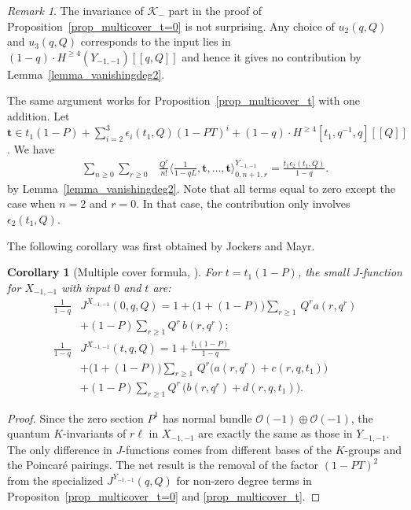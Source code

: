 \documentclass[11pt]{amsart}
\newtheorem{corollary}[theorem]{Corollary}
\newtheorem*{main theorem*}{Main Theorem}
\theoremstyle{remark}
\newtheorem{remark}[theorem]{Remark}
\numberwithin{equation}{section}
\def\O{\mathcal{O}}
\begin{document}
\begin{remark}
The invariance of $\mathcal{K}_-$ part in the proof of Proposition~\ref{prop_multicover_t=0} is not surprising. Any choice of $u_2(q,Q)$ and $u_3(q,Q)$ corresponds to the input lies in $(1-q)\cdot H^{\geq 4}(Y_{-1,-1})[\![q, Q]\!]$ and hence it gives no contribution by Lemma~\ref{lemma_vanishingdeg2}.

The same argument works for Proposition~\ref{prop_multicover_t} with one addition. Let $\mathbf{t} \in  t_1(1-P) + \sum_{i=2}^3\epsilon_i(t_1,Q)(1-PT)^i + (1-q) \cdot H^{\geq 4}[t_1,q^{-1},q][\![Q]\!] $. We have
\[
\begin{split}
\sum_{n\geq 0}\sum_{r\geq 0} & \frac{Q^r}{n!}\langle \frac{1}{1-qL}, \mathbf{t},\dots, \mathbf{t}\rangle_{0,n+1,r}^{Y_{-1,-1}}
 =\frac{ t_1 \epsilon_2(t_1,Q)}{1-q}.
\end{split}
\]
by Lemma~\ref{lemma_vanishingdeg2}. Note that all terms equal to zero except the case when $n=2$ and $r=0$. In that case, the contribution only involves $\epsilon_2(t_1,Q)$.
\end{remark}

The following corollary was first obtained by Jockers and Mayr.

\begin{corollary}[Multiple cover formula, {\cite[\S~2.3]{Jockers_Mayr_2019} } ] \label{c:4.8}
For $t = t_1(1-P)$, the small $J$-function for $X_{-1,-1}$ with input $0$ and $t$ are:
\[
\begin{split}
\frac{1}{1-q} & J^{X_{-1,-1}}(0,q,Q) = 1 + \Big(1 +(1-P)\Big)\sum_{r \geq 1} \, Q^r a(r, q^r) 
\\
& + (1-P) \sum_{r\geq 1} Q^r \, b(r, q^r) ;
\\
\frac{1}{1-q} & J^{X_{-1,-1}}(t, q, Q) = 1 + \frac{t_1(1-P)}{1-q}
\\
&+  \Big(1 +(1-P)\Big)\sum_{r \geq 1} \, Q^r\Big( a(r, q^r) + c(r,q, t_1) \Big) %
\\
& + (1-P) \sum_{r\geq 1} Q^r \, \Big( b(r, q^r) + d(r,q, t_1) \Big) .
\end{split}
\]
\end{corollary}

\begin{proof}
Since the zero section $P^1$ has normal bundle $\O(-1) \oplus \O(-1)$, the quantum $K$-invariants of $r \ell$ in $X_{-1,-1}$ are exactly the same as those in $Y_{-1,-1}$. The only difference in $J$-functions comes from different bases of the $K$-groups and the Poincar\'e pairings. The net result is the removal of the factor $(1-PT)^2$ from the specialized $J^{Y_{-1,-1}}(q, Q)$ for non-zero degree terms in Propositon~\ref{prop_multicover_t=0} and \ref{prop_multicover_t}.
\end{proof}
\end{document}
